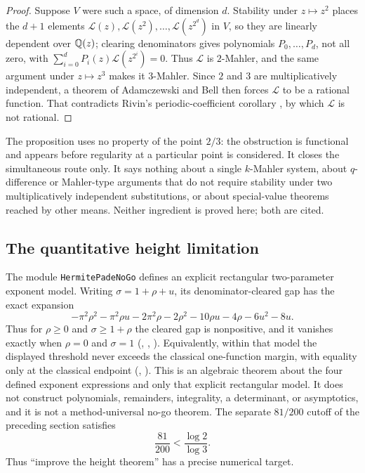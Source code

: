 \documentclass[11pt]{article}
\begin{document}
\begin{proof}
Suppose $V$ were such a space, of dimension $d$.  Stability under $z\mapsto z^2$
places the $d+1$ elements $\mathcal L(z),\mathcal L(z^2),\dots,\mathcal
L(z^{2^{d}})$ in $V$, so they are linearly dependent over $\mathbb{Q}(z)$; clearing
denominators gives polynomials $P_0,\dots,P_d$, not all zero, with
$\sum_{i=0}^{d}P_i(z)\mathcal L(z^{2^i})=0$.  Thus $\mathcal L$ is $2$-Mahler,
and the same argument under $z\mapsto z^3$ makes it $3$-Mahler.  Since $2$ and
$3$ are multiplicatively independent, a theorem of Adamczewski and Bell
\cite[Theorem~1]{adamczewskibell2013} then forces $\mathcal L$ to be a rational
function.  That contradicts Rivin's periodic-coefficient corollary
\cite[Cor.~6.4, p.~9]{rivin2026}, by which $\mathcal L$ is not rational.
\end{proof}

The proposition uses no property of the point $2/3$: the obstruction is
functional and appears before regularity at a particular point is considered.
It closes the simultaneous route only.  It says nothing about a single
$k$-Mahler system, about $q$-difference or Mahler-type arguments that do not
require stability under two multiplicatively independent substitutions, or about
special-value theorems reached by other means.  Neither ingredient is proved
here; both are cited.

\subsection{The quantitative height limitation}

The module \texttt{HermitePadeNoGo} defines an explicit rectangular
two-parameter exponent model.  Writing $\sigma=1+\rho+u$, its
denominator-cleared gap has the exact expansion
\[
 -\pi^2\rho^2-\pi^2\rho u-2\pi^2\rho-2\rho^2-10\rho u
 -4\rho-6u^2-8u.
\]
Thus for $\rho\ge0$ and $\sigma\ge1+\rho$ the cleared gap is nonpositive, and
it vanishes exactly when $\rho=0$ and $\sigma=1$
(,
,
).
Equivalently, within that model the displayed threshold never exceeds the
classical one-function margin, with equality only at the classical endpoint
(,
).
This is an algebraic theorem about the four defined exponent expressions and
only that explicit rectangular model.  It does not construct polynomials,
remainders, integrality, a determinant, or asymptotics, and it is not a
method-universal no-go theorem.
The separate $81/200$ cutoff of the preceding section satisfies
\[
 \frac{81}{200}<\frac{\log2}{\log3}.
\]
Thus “improve the height theorem” has a precise numerical target.
\end{document}
